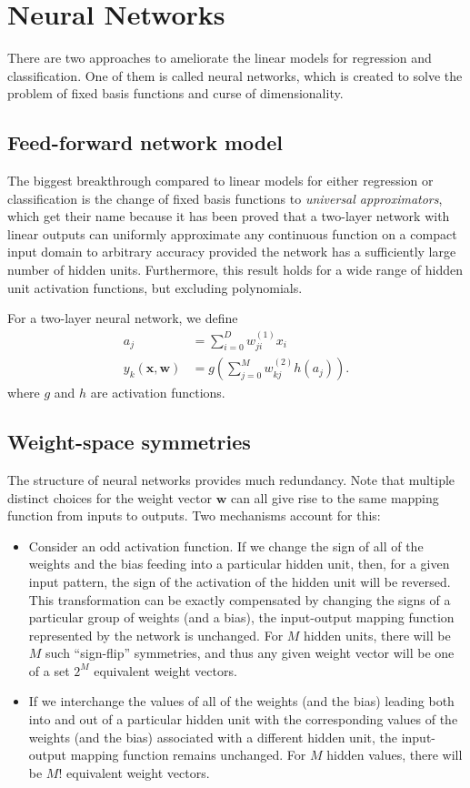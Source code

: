 \documentclass[a4paper]{report}
\renewcommand{\bf}{\mathbf}
\newcommand{\imp}[1]{{\color{blue}\textit{#1}}}
\begin{document}
\section{Neural Networks}
There are two approaches to ameliorate the linear models for regression and classification. One of them is called neural networks, which is created to solve the problem of fixed basis functions and curse of dimensionality. 

\subsection{Feed-forward network model}
The biggest breakthrough compared to linear models for either regression or classification is the change of fixed basis functions to \imp{universal approximators}, which get their name because it has been proved that a two-layer network with linear outputs can uniformly approximate any continuous function on a compact input domain to arbitrary accuracy provided the network has a sufficiently large number of hidden units. Furthermore, this result holds for a wide range of hidden unit activation functions, but excluding polynomials.

For a two-layer neural network, we define
\begin{align}
	a_j &= \sum_{i=0} ^D w_{ji}^{(1)} x_i \\
	y_k(\bf{x,w}) &= g\left( \sum_{j=0}^M w_{kj}^{(2)} h(a_j) \right).
\end{align}
where $g$ and $h$ are activation functions.

\subsection{Weight-space symmetries}
The structure of neural networks provides much redundancy. Note that multiple distinct choices for the weight vector $\bf{w}$ can all give rise to the same mapping function from inputs to outputs. Two mechanisms account for this:
\begin{itemize}
	\item Consider an odd activation function. If we change the sign of all of the weights and the bias feeding into a particular hidden unit, then, for a given input pattern, the sign of the activation of the hidden unit will be reversed. This transformation can be exactly compensated by changing the signs of a particular group of weights (and a bias), the input-output mapping function represented by the network is unchanged. For $M$ hidden units, there will be $M$ such ``sign-flip'' symmetries, and thus any given weight vector will be one of a set $2^M$ equivalent weight vectors.
	\item If we interchange the values of all of the weights (and the bias) leading both into and out of a particular hidden unit with the corresponding values of the weights (and the bias) associated with a different hidden unit, the input-output mapping function remains unchanged. For $M$ hidden values, there will be $M!$ equivalent weight vectors.
\end{itemize}
\end{document}
